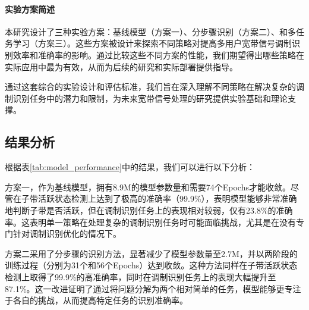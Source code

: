 \paragraph{实验方案简述} 本研究设计了三种实验方案：基线模型（方案一）、分步骤识别（方案二）、和多任务学习（方案三）。这些方案被设计来探索不同策略对提高多用户宽带信号调制识别效率和准确率的影响。通过比较这些不同方案的性能，我们期望得出哪些策略在实际应用中最为有效，从而为后续的研究和实际部署提供指导。

通过这套综合的实验设计和评估标准，我们旨在深入理解不同策略在解决复杂的调制识别任务中的潜力和限制，为未来宽带信号处理的研究提供实验基础和理论支撑。



\subsection{结果分析}\label{sec:background}

\begin{table}[ht]
    \centering
    \caption{不同模型的性能比较}
    \label{tab:model_performance}
\end{table}

根据表\ref{tab:model_performance}中的结果，我们可以进行以下分析：

方案一，作为基线模型，拥有8.9M的模型参数量和需要74个Epochs才能收敛。尽管在子带活跃状态检测上达到了极高的准确率（99.9\%），表明模型能够非常准确地判断子带是否活跃，但在调制识别任务上的表现相对较弱，仅有23.8\%的准确率。这表明单一策略在处理复杂的调制识别任务时可能面临挑战，尤其是在没有专门针对调制识别优化的情况下。

方案二采用了分步骤的识别方法，显著减少了模型参数量至2.7M，并以两阶段的训练过程（分别为31个和56个Epochs）达到收敛。这种方法同样在子带活跃状态检测上取得了99.9\%的高准确率，同时在调制识别任务上的表现大幅提升至87.1\%。这一改进证明了通过将问题分解为两个相对简单的任务，模型能够更专注于各自的挑战，从而提高特定任务的识别准确率。


